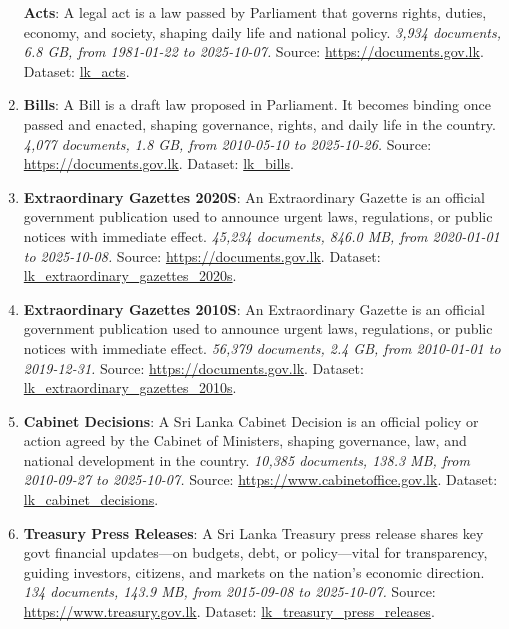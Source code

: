 \documentclass[10pt,a4paper]{article}%
\begin{document}
\begin{enumerate}
\textbf{Acts}: A legal act is a law passed by Parliament that governs rights, duties, economy, and society, shaping daily life and national policy.\textit{ 3,934 documents, 6.8 GB, from 1981{-}01{-}22 to 2025{-}10{-}07.} Source: \href{https://documents.gov.lk}{https://documents.gov.lk}. Dataset: \href{https://github.com/nuuuwan/lk\_legal\_docs/tree/data\_lk\_acts/data/lk\_acts}{lk\_acts}.%
\item%
\textbf{Bills}: A Bill is a draft law proposed in Parliament. It becomes binding once passed and enacted, shaping governance, rights, and daily life in the country.\textit{ 4,077 documents, 1.8 GB, from 2010{-}05{-}10 to 2025{-}10{-}26.} Source: \href{https://documents.gov.lk}{https://documents.gov.lk}. Dataset: \href{https://github.com/nuuuwan/lk\_legal\_docs/tree/data\_lk\_bills/data/lk\_bills}{lk\_bills}.%
\item%
\textbf{Extraordinary Gazettes 2020S}: An Extraordinary Gazette is an official government publication used to announce urgent laws, regulations, or public notices with immediate effect.\textit{ 45,234 documents, 846.0 MB, from 2020{-}01{-}01 to 2025{-}10{-}08.} Source: \href{https://documents.gov.lk}{https://documents.gov.lk}. Dataset: \href{https://github.com/nuuuwan/lk\_legal\_docs/tree/data\_lk\_extraordinary\_gazettes\_2020s/data/lk\_extraordinary\_gazettes\_2020s}{lk\_extraordinary\_gazettes\_2020s}.%
\item%
\textbf{Extraordinary Gazettes 2010S}: An Extraordinary Gazette is an official government publication used to announce urgent laws, regulations, or public notices with immediate effect.\textit{ 56,379 documents, 2.4 GB, from 2010{-}01{-}01 to 2019{-}12{-}31.} Source: \href{https://documents.gov.lk}{https://documents.gov.lk}. Dataset: \href{https://github.com/nuuuwan/lk\_legal\_docs/tree/data\_lk\_extraordinary\_gazettes\_2010s/data/lk\_extraordinary\_gazettes\_2010s}{lk\_extraordinary\_gazettes\_2010s}.%
\item%
\textbf{Cabinet Decisions}: A Sri Lanka Cabinet Decision is an official policy or action agreed by the Cabinet of Ministers, shaping governance, law, and national development in the country.\textit{ 10,385 documents, 138.3 MB, from 2010{-}09{-}27 to 2025{-}10{-}07.} Source: \href{https://www.cabinetoffice.gov.lk}{https://www.cabinetoffice.gov.lk}. Dataset: \href{https://github.com/nuuuwan/lk\_cabinet\_decisions/tree/data/data/lk\_cabinet\_decisions}{lk\_cabinet\_decisions}.%
\item%
\textbf{Treasury Press Releases}: A Sri Lanka Treasury press release shares key govt financial updates—on budgets, debt, or policy—vital for transparency, guiding investors, citizens, and markets on the nation’s economic direction.\textit{ 134 documents, 143.9 MB, from 2015{-}09{-}08 to 2025{-}10{-}07.} Source: \href{https://www.treasury.gov.lk}{https://www.treasury.gov.lk}. Dataset: \href{https://github.com/nuuuwan/lk\_treasury/tree/data\_lk\_treasury\_press\_releases/data/lk\_treasury\_press\_releases}{lk\_treasury\_press\_releases}.%

\end{enumerate}
\end{document}
